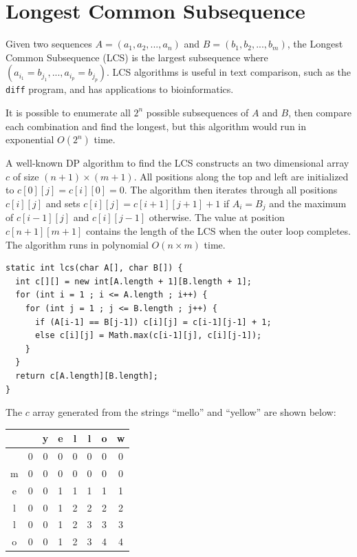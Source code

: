 \documentclass{book}
\begin{document}
\section{Longest Common Subsequence}

Given two sequences $A = (a_1, a_2, ... , a_n)$ and $B = (b_1, b_2, ... , b_m)$, the Longest Common Subsequence (LCS) is the largest subsequence where $(a_{i_1} = b_{j_1} , ... , a_{i_p} = b_{j_p})$. LCS algorithms is useful in text comparison, such as the \texttt{diff} program, and has applications to bioinformatics.

It is possible to enumerate all $2^n$ possible subsequences of $A$ and $B$, then compare each combination and find the longest, but this algorithm would run in exponential $O(2^n)$ time.

A well-known DP algorithm to find the LCS constructs an two dimensional array $c$ of size $(n+1) \times (m+1)$. All positions along the top and left are initialized to $c[0][j] = c[i][0] = 0$. The algorithm then iterates through all positions $c[i][j]$ and sets $c[i][j] = c[i+1][j+1] + 1$ if $A_i = B_j$ and the maximum of $c[i-1][j]$ and $c[i][j-1]$ otherwise. The value at position $c[n + 1][m + 1]$ contains the length of the LCS when the outer loop completes. The algorithm runs in polynomial $O(n \times m)$ time.

\begin{lstlisting}
static int lcs(char A[], char B[]) {
  int c[][] = new int[A.length + 1][B.length + 1];
  for (int i = 1 ; i <= A.length ; i++) {
    for (int j = 1 ; j <= B.length ; j++) {
      if (A[i-1] == B[j-1]) c[i][j] = c[i-1][j-1] + 1;
      else c[i][j] = Math.max(c[i-1][j], c[i][j-1]);
    }
  }
  return c[A.length][B.length];
}
\end{lstlisting}

The $c$ array generated from the strings ``mello'' and ``yellow'' are shown below:

\begin{center}
\begin{tabular}{c | c | c | c | c | c | c | c }
& & y & e & l & l & o & w \\
\hline
 & 0 & 0 & 0 & 0 & 0 & 0 & 0 \\
\hline
m & 0 & 0 & 0 & 0 & 0 & 0 & 0 \\
\hline
e & 0 & 0 & 1 & 1 & 1 & 1 & 1 \\
\hline
l & 0 & 0 & 1 & 2 & 2 & 2 & 2 \\
\hline
l & 0 & 0 & 1 & 2 & 3 & 3 & 3 \\
\hline
o & 0 & 0 & 1 & 2 & 3 & 4 & 4
\end{tabular}
\end{center}
\end{document}
